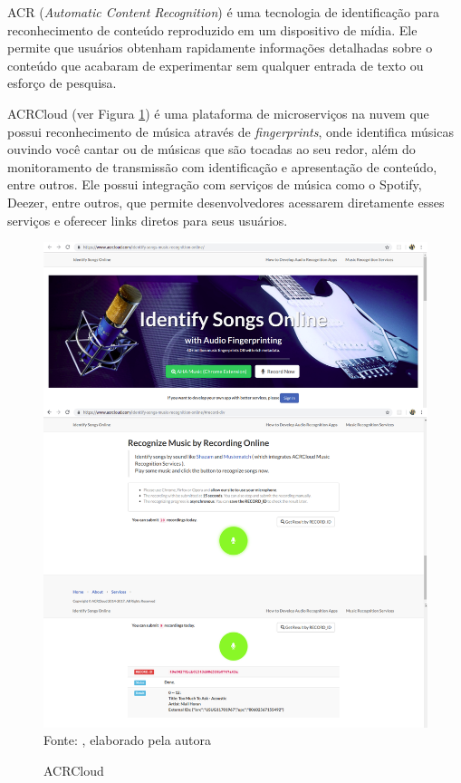 ACR (\textit{Automatic Content Recognition}) é uma tecnologia de identificação para reconhecimento de conteúdo reproduzido em um dispositivo de mídia. Ele permite que usuários obtenham rapidamente informações detalhadas sobre o conteúdo que acabaram de experimentar sem qualquer entrada de texto ou esforço de pesquisa.

ACRCloud (ver Figura \ref{fig:acrcloud}) é uma plataforma de microserviços na nuvem que possui reconhecimento de música através de \textit{fingerprints}, onde identifica músicas ouvindo você cantar ou de músicas que são tocadas ao seu redor, além do monitoramento de transmissão com identificação e apresentação de conteúdo, entre outros. Ele possui integração com serviços de música como o Spotify, Deezer, entre outros, que permite desenvolvedores acessarem diretamente esses serviços e oferecer links diretos para seus usuários.

\begin{figure}[!htb]
   \centering
   \caption{ACRCloud}\label{fig:acrcloud} 
   \includegraphics[scale=0.20]{figuras/acrcloud.png}
   \\Fonte: \cite{acrcloudSite}, elaborado pela autora
\end{figure}


